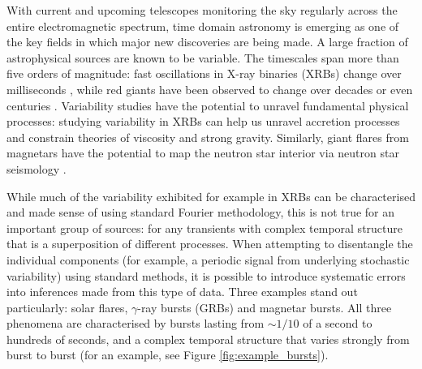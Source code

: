 \documentclass[12pt]{emulateapj}
\begin{document}
With current and upcoming telescopes monitoring the sky regularly across the entire electromagnetic spectrum, time domain astronomy is emerging as one of the key fields in which major 
new discoveries are being made.  A large fraction of astrophysical sources are known to be variable. The timescales span more than five orders of magnitude: fast oscillations in 
X-ray binaries (XRBs) change over milliseconds \citep[e.g.][]{xrb_khzqpos}, while red giants have been observed to change over decades or even centuries \citep[e.g.][]{dasch_giants}. 
Variability studies have the potential to unravel fundamental physical processes: studying variability in XRBs can help us unravel accretion processes and constrain theories of viscosity and strong gravity. 
Similarly, giant flares from magnetars have the potential to map the neutron star interior via neutron star seismology \citep{steiner2009}. 

While much of the variability exhibited for example in XRBs can be characterised and made sense of using standard Fourier methodology, this is not true for an important group of sources: for any transients 
with complex temporal structure that is a superposition of different processes. When attempting to disentangle the individual components (for example, a periodic signal from underlying stochastic variability)
using standard methods, it is possible to introduce systematic errors into inferences made from this type of data. Three examples stand out particularly: solar flares, $\gamma$-ray bursts (GRBs) and magnetar bursts.  All three phenomena are characterised by bursts lasting from $\sim 1/10$ of a second to hundreds of seconds, and a 
complex temporal structure that varies strongly from burst to burst (for an example, see Figure \ref{fig:example_bursts}). 
\end{document}
